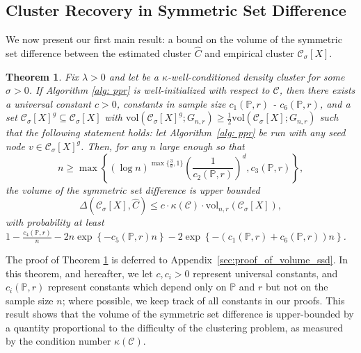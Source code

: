 \documentclass[11pt,twoside]{article}
\newtheorem{theorem}{Theorem}
\newcommand{\set}[1]{\left\{#1\right\}}
\newcommand{\vol}{\mathrm{vol}}
\newcommand{\1}{\mathbf{1}}
\newcommand{\Xbf}{X}             %
\newcommand{\Pbb}{\mathbb{P}}
\newcommand{\Cbb}{\mathbb{C}}
\newcommand{\Cset}{\mathcal{C}}
\newcommand{\Csig}{\Cset_{\sigma}}
\newcommand{\Cest}{\widehat{C}}
\begin{document}
\subsection{Cluster Recovery in Symmetric Set Difference}
We now present our first main result: a bound on the volume of the symmetric set difference between the estimated cluster $\widehat{C}$ and empirical cluster $\Csig[\Xbf]$. 
\begin{theorem}
  \label{thm:volume_ssd}
  Fix $\lambda > 0$ and let \smash{$\Cset \in \Cbb_f(\lambda)$} be a
  $\kappa$-well-conditioned density cluster for some $\sigma > 0$. If Algorithm \ref{alg: ppr} is \emph{well-initialized} with respect to $\Cset$, then there exists a universal constant $c > 0$, constants in sample size $c_1(\Pbb,r)$ - $c_6(\Pbb,r)$, and a set $\Csig[\Xbf]^g \subseteq \Csig[\Xbf]$ with $\vol(\Csig[\Xbf]^g; G_{n,r}) \geq \frac{1}{2}\vol(\Csig[\Xbf];G_{n,r})$ such that the following statement holds: let Algorithm~\ref{alg: ppr} be run with any seed node $v \in \Csig[\Xbf]^g$. Then, for any $n$ large enough so that
  \begin{equation*}
  n \geq \max\left\{(\log n)^{\max\{\frac{3}{d},1\}}\left(\frac{1}{c_2(\Pbb,r)}\right)^d, c_3(\Pbb,r)\right\},
  \end{equation*}
  the volume of the symmetric set difference is upper bounded
  \begin{equation}
    \label{eqn:volume_ssd}
    \Delta(\Csig[\Xbf], \Cest) \leq c \cdot \kappa(\Cset) \cdot \vol_{n,r}(\Csig[\Xbf]),
  \end{equation}
  with probability at least $1 - \frac{c_4(\Pbb,r)}{n} - 2n\exp\set{-c_5(\Pbb,r)n} - 2\exp\set{-(c_1(\Pbb,r) + c_6(\Pbb,r))n}$. 
\end{theorem}
The proof of Theorem \ref{thm:volume_ssd} is deferred to Appendix~\ref{sec:proof_of_volume_ssd}. In this theorem, and hereafter, we let $c, c_i > 0$ represent universal constants, and $c_i(\Pbb,r)$ represent constants which depend only on $\Pbb$ and $r$ but not on the sample size $n$; where possible, we keep track of all constants in our proofs. 
This result shows that the volume of the symmetric set difference \smash{$\Delta(\Csig[\Xbf],
  \Cest)$} is upper-bounded by a quantity proportional to the difficulty of the clustering problem, as
measured by the condition number $\kappa(\Cset)$.
\end{document}

